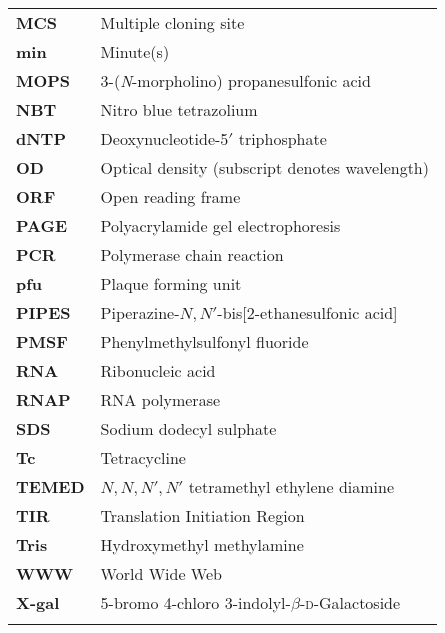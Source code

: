 \begin{center}
\begin{longtable}{l@{\ -\ \ }l}
\textbf{MCS} & Multiple cloning site \\
\textbf{min} & Minute(s) \\
\textbf{MOPS} & 3-(\textit{N}-morpholino) propanesulfonic acid \\
\addlinespace
\textbf{NBT} & Nitro blue tetrazolium \\
\textbf{dNTP} & Deoxynucleotide-5$'$ triphosphate \\
\addlinespace
\textbf{OD} & Optical density (subscript denotes wavelength) \\
\textbf{ORF} & Open reading frame \\
\addlinespace
\textbf{PAGE} & Polyacrylamide gel electrophoresis \\
\textbf{PCR} & Polymerase chain reaction \\
\textbf{pfu} & Plaque forming unit\\
\textbf{PIPES} & Piperazine-$N, N'$-bis[2-ethanesulfonic acid]\\
\textbf{PMSF} & Phenylmethylsulfonyl fluoride \\
\addlinespace
\textbf{RNA} & Ribonucleic acid \\
\textbf{RNAP} & RNA polymerase\\ \addlinespace
\textbf{SDS} & Sodium dodecyl sulphate \\
\addlinespace
\textbf{Tc} & Tetracycline \\
\textbf{TEMED} & $N, N, N', N'$ tetramethyl ethylene diamine \\
\textbf{TIR} & Translation Initiation Region \\
\textbf{Tris} &  Hydroxymethyl methylamine\\
\addlinespace
\textbf{WWW} & World Wide Web \\
\addlinespace \textbf{X-gal} & 5-bromo 4-chloro
3-indolyl-$\beta$-\textsc{d}-Galactoside \\\addlinespace\hline
\end{longtable}
\end{center}
